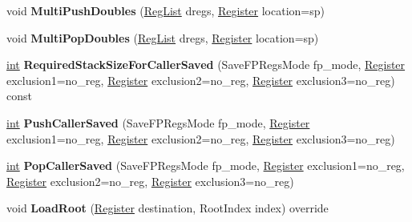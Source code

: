 \begin{DoxyCompactItemize}
void {\bfseries Multi\+Push\+Doubles} (\mbox{\hyperlink{classuint32__t}{Reg\+List}} dregs, \mbox{\hyperlink{classv8_1_1internal_1_1Register}{Register}} location=sp)
\item 
\mbox{\label{classv8_1_1internal_1_1TurboAssembler_a8ff4ea98fca2313a326d1a16bbb77a95}} 
void {\bfseries Multi\+Pop\+Doubles} (\mbox{\hyperlink{classuint32__t}{Reg\+List}} dregs, \mbox{\hyperlink{classv8_1_1internal_1_1Register}{Register}} location=sp)
\item 
\mbox{\label{classv8_1_1internal_1_1TurboAssembler_ade281f6d328e2fdd51963e91bda13365}} 
\mbox{\hyperlink{classint}{int}} {\bfseries Required\+Stack\+Size\+For\+Caller\+Saved} (Save\+F\+P\+Regs\+Mode fp\+\_\+mode, \mbox{\hyperlink{classv8_1_1internal_1_1Register}{Register}} exclusion1=no\+\_\+reg, \mbox{\hyperlink{classv8_1_1internal_1_1Register}{Register}} exclusion2=no\+\_\+reg, \mbox{\hyperlink{classv8_1_1internal_1_1Register}{Register}} exclusion3=no\+\_\+reg) const
\item 
\mbox{\label{classv8_1_1internal_1_1TurboAssembler_a05799e0b139129becdabdf8af8e18810}} 
\mbox{\hyperlink{classint}{int}} {\bfseries Push\+Caller\+Saved} (Save\+F\+P\+Regs\+Mode fp\+\_\+mode, \mbox{\hyperlink{classv8_1_1internal_1_1Register}{Register}} exclusion1=no\+\_\+reg, \mbox{\hyperlink{classv8_1_1internal_1_1Register}{Register}} exclusion2=no\+\_\+reg, \mbox{\hyperlink{classv8_1_1internal_1_1Register}{Register}} exclusion3=no\+\_\+reg)
\item 
\mbox{\label{classv8_1_1internal_1_1TurboAssembler_a5f104f3d3c969b063fb4d1dfdc643b1c}} 
\mbox{\hyperlink{classint}{int}} {\bfseries Pop\+Caller\+Saved} (Save\+F\+P\+Regs\+Mode fp\+\_\+mode, \mbox{\hyperlink{classv8_1_1internal_1_1Register}{Register}} exclusion1=no\+\_\+reg, \mbox{\hyperlink{classv8_1_1internal_1_1Register}{Register}} exclusion2=no\+\_\+reg, \mbox{\hyperlink{classv8_1_1internal_1_1Register}{Register}} exclusion3=no\+\_\+reg)
\item 
\mbox{\label{classv8_1_1internal_1_1TurboAssembler_a931af7443ae4f741ae52403554cca319}} 
void {\bfseries Load\+Root} (\mbox{\hyperlink{classv8_1_1internal_1_1Register}{Register}} destination, Root\+Index index) override

\end{DoxyCompactItemize}

